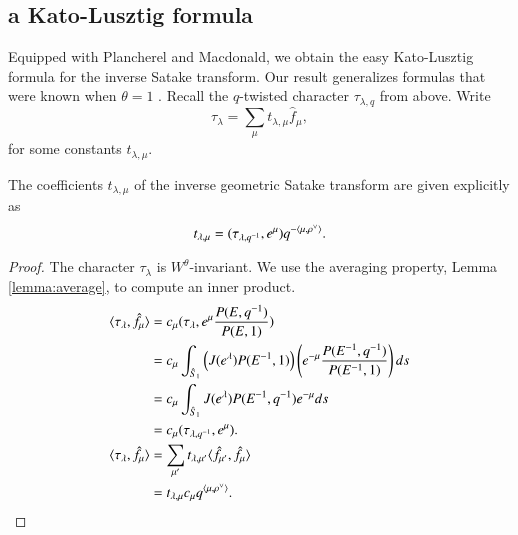 \subsection{a Kato-Lusztig formula}

Equipped with Plancherel and Macdonald, we obtain the easy Kato-Lusztig formula for the inverse Satake transform.
Our result generalizes formulas that were known when $\theta=1$ \cite{kato1982spherical} \cite{lusztig1983singularities}.
Recall the $q$-twisted character  $\tau_{\lambda,q}$ from above.
Write 
\[
\tau_\lambda = \sum_\mu t_{\lambda,\mu}  \hat f_\mu,
\]
for some constants $t_{\lambda,\mu}$.

\begin{theorem}
The coefficients $t_{\lambda,\mu}$ of the inverse geometric Satake transform are given explicitly as
\[
t_{\lambda,\mu} =  (\tau_{\lambda,q^{-1}},e^\mu) q^{-\langle{\mu,\rho^\vee}\rangle}.
\]
\end{theorem}

\begin{proof}
The character $\tau_\lambda$ is $W^\theta$-invariant. 
We use the averaging property, Lemma \ref{lemma:average}, to compute an inner product.
\begin{align*}
\langle{\tau_\lambda,\hat f_\mu}\rangle
&=c_\mu(\tau_\lambda,e^\mu \frac{P(E,q^{-1})}{P(E,1)})\\
&=c_\mu\int_{\hat S_1} \left(J(e^\lambda) P(E^{-1},1)\right) \left( e^{-\mu}\frac{P(E^{-1},q^{-1})}{P(E^{-1},1)} \right) ds\\
&=
c_\mu\int_{\hat S_1} J(e^\lambda) P(E^{-1},q^{-1}) e^{-\mu} ds\\
&= c_\mu(\tau_{\lambda,q^{-1}},e^\mu).\\
\langle{\tau_\lambda,\hat f_\mu}\rangle
&=\sum_{\mu'} t_{\lambda,\mu'} \langle{\hat f_{\mu'},\hat f_\mu}\rangle \\
&= t_{\lambda,\mu} c_\mu q^{\langle{\mu,\rho^\vee}\rangle}.
\end{align*}
\end{proof}



